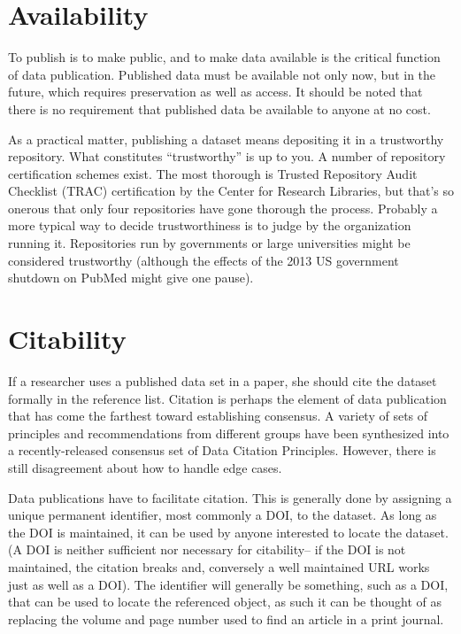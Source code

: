\documentclass[10pt,a4paper,twocolumn]{article}
\begin{document}

\section*{Availability}\label{availability}

To publish is to make public, and to make data available is the critical function of data publication. 
Published data must be available not only now, but in the future, which requires preservation as well as access. 
It should be noted that there is no requirement that published data be available to anyone at no cost.

As a practical matter, publishing a dataset means depositing it in a trustworthy repository. 
What constitutes ``trustworthy'' is up to you. 
A number of repository certification schemes exist. The most thorough is Trusted Repository Audit Checklist (TRAC)\cite{trac_2007} certification by the Center for Research Libraries, but that's so onerous that only four repositories have gone thorough the process. 
Probably a more typical way to decide trustworthiness is to judge by the organization running it. 
Repositories run by governments or large universities might be considered trustworthy (although the effects of the 2013 US government shutdown on PubMed might give one pause).


\section*{Citability}\label{citability}

If a researcher uses a published data set in a paper, she should cite the dataset formally in the reference list. 
Citation is perhaps the element of data publication that has come the farthest toward establishing consensus.
A variety of sets of principles and recommendations from different groups have been synthesized into a recently-released consensus set of Data Citation Principles. \cite{force11_data_2014} 
However, there is still disagreement about how to handle edge cases.

Data publications have to facilitate citation. 
This is generally done by assigning a unique permanent identifier, most commonly a DOI, to the dataset. 
As long as the DOI is maintained, it can be used by anyone interested to locate the dataset. 
(A DOI is neither sufficient nor necessary for citability-- if the DOI is not maintained, the citation breaks and, conversely a well maintained URL works just as well as a DOI). 
The identifier will generally be something, such as a DOI, that can be used to locate the referenced object, as such it can be thought of as replacing the volume and page number used to find an article in a print journal.
\end{document}
